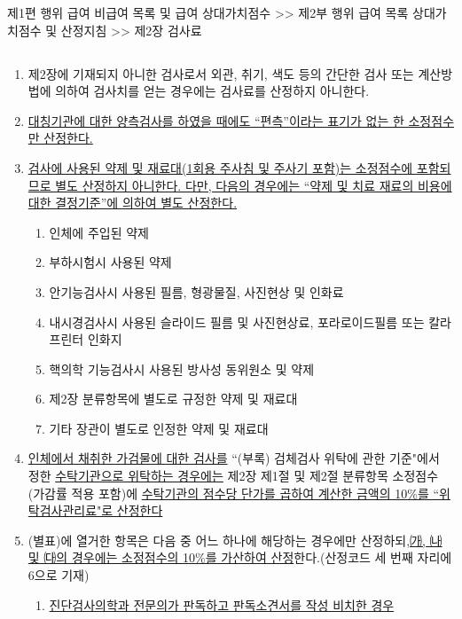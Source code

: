 \begin{mdframed}[linecolor=blue,middlelinewidth=2]  
제1편 행위 급여 \cntrdot{}  비급여 목록 및 급여 상대가치점수 >> 제2부 행위 급여 목록\cntrdot{} 상대가치점수 및 산정지침 >> 제2장 검사료
\end{mdframed}

\subsection{}
\begin{enumerate}[(1)]\tightlist
\item 제2장에 기재되지 아니한 검사로서 외관, 취기, 색도 등의 간단한 검사 또는 계산방법에 의하여 검사치를 얻는 경우에는 검사료를 산정하지 아니한다.
\item \uline{대칭기관에 대한 양측검사를 하였을 때에도 “편측”이라는 표기가 없는 한 소정점수만 산정한다.}
\item \uline{검사에 사용된 약제 및 재료대(1회용 주사침 및 주사기 포함)는 소정점수에 포함되므로 별도 산정하지 아니한다. 다만, 다음의 경우에는 “약제 및 치료 재료의 비용에 대한 결정기준”에 의하여 별도 산정한다.}
	\begin{enumerate}[(가)]\tightlist
	\item 인체에 주입된 약제
	\item 부하시험시 사용된 약제
	\item 안기능검사시 사용된 필름, 형광물질, 사진현상 및 인화료
	\item 내시경검사시 사용된 슬라이드 필름 및 사진현상료, 포라로이드필름 또는 칼라프린터 인화지
	\item 핵의학 기능검사시 사용된 방사성 동위원소 및 약제
	\item 제2장 분류항목에 별도로 규정한 약제 및 재료대
	\item 기타 장관이 별도로 인정한 약제 및 재료대
	\end{enumerate}
\item \uline{인체에서 채취한 가검물에 대한 검사를} “(부록) 검체검사 위탁에 관한 기준"에서 정한 \uline{수탁기관으로 위탁하는 경우에는} 제2장 제1절 및 제2절 분류항목 소정점수(가감률 적용 포함)에 \uline{수탁기관의 점수당 단가를 곱하여 계산한 금액의 10\%를 “위탁검사관리료"로 산정한다}
\item (별표)에 열거한 항목은 다음 중 어느 하나에 해당하는 경우에만 산정하되,\uline{㈎, ㈏ 및 ㈐의 경우에는 소정점수의 10\%를 가산하여 산정}한다.(산정코드 세 번째 자리에 6으로 기재)
	\begin{enumerate}[(가)]\tightlist
	\item \uline{진단검사의학과 전문의가 판독하고 판독소견서를 작성\cntrdot{} 비치한 경우}

\end{enumerate}
\end{enumerate}
